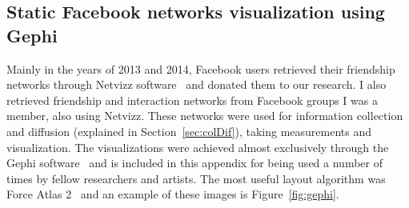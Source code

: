 \begin{apendicesenv}
	\subsection{Static Facebook networks visualization using Gephi}\label{sec:gephi}
	Mainly in the years of 2013 and 2014, Facebook users retrieved their friendship networks through Netvizz software~\cite{netvizz}
	and donated them to our research.
	I also retrieved friendship and interaction networks from Facebook groups I was a member, also using Netvizz.
	These networks were used for information collection and diffusion (explained in Section~\ref{sec:colDif}),
	taking measurements and visualization.
	The visualizations were achieved almost exclusively through the Gephi software~\cite{gephi}
	and is included in this appendix for being used a number of times by fellow researchers and artists.
	The most useful layout algorithm was Force Atlas 2~\cite{fa2} and an example of these images is Figure~\ref{fig:gephi}.



\end{apendicesenv}

